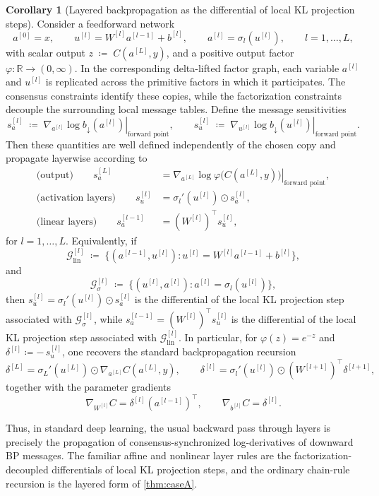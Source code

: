 \documentclass[12pt]{article}
\newcommand{\1}{\mathbb{1}}
\renewcommand{\phi}{\varphi}
\newcommand{\defeq}{\coloneq}
\theoremstyle{definition}
\newtheorem{corollary}[theorem]{Corollary}
\begin{document}
\begin{corollary}[Layered backpropagation as the differential of local KL projection steps]
\label{cor:layered-geometric}
Consider a feedforward network
\[
a^{[0]}=x,\qquad
u^{[l]}=W^{[l]}a^{[l-1]}+b^{[l]},\qquad
a^{[l]}=\sigma_l(u^{[l]}),
\qquad l=1,\dots,L,
\]
with scalar output $z \;\defeq\; C(a^{[L]},y)$, and a positive output factor $\phi:\mathbb{R}\to(0,\infty)$. In the corresponding delta-lifted factor graph, each variable
$a^{[l]}$ and $u^{[l]}$ is replicated across the primitive factors in which
it participates. The consensus constraints identify these copies, while the
factorization constraints decouple the surrounding local message tables.
Define the message sensitivities
\[
s_a^{[l]}
\;\defeq\;
\left.\nabla_{a^{[l]}} \log b_\downarrow(a^{[l]})\right|_{\text{forward point}},
\qquad
s_u^{[l]}
\;\defeq\;
\left.\nabla_{u^{[l]}} \log b_\downarrow(u^{[l]})\right|_{\text{forward point}}.
\]
Then these quantities are well defined independently of the chosen copy and
propagate layerwise according to
\begin{align*}
\text{(output)}\qquad
s_a^{[L]}
&=
\left.\nabla_{a^{[L]}} \log \phi\big(C(a^{[L]},y)\big)\right|_{\text{forward point}},\\[0.5em]
\text{(activation layers)}\qquad
s_u^{[l]}
&=
\sigma_l'(u^{[l]}) \odot s_a^{[l]},\\[0.5em]
\text{(linear layers)}\qquad
s_a^{[l-1]}
&=
(W^{[l]})^\top s_u^{[l]},
\end{align*}
for $l=1,\dots,L$. Equivalently, if
\[
\mathcal G_{\mathrm{lin}}^{[l]}
\;\defeq\;
\bigl\{(a^{[l-1]},u^{[l]}) : u^{[l]}=W^{[l]}a^{[l-1]}+b^{[l]}\bigr\},
\]
and
\[
\mathcal G_{\sigma}^{[l]}
\;\defeq\;
\bigl\{(u^{[l]},a^{[l]}) : a^{[l]}=\sigma_l(u^{[l]})\bigr\},
\]
then $s_u^{[l]}=\sigma_l'(u^{[l]})\odot s_a^{[l]}$ is the differential of the local KL projection step associated with
$\mathcal G_{\sigma}^{[l]}$, while $s_a^{[l-1]}=(W^{[l]})^\top s_u^{[l]}$ is the differential of the local KL projection step associated with
$\mathcal G_{\mathrm{lin}}^{[l]}$. In particular, for $\phi(z)=e^{-z}$ and $\delta^{[l]}\defeq -\,s_u^{[l]}$,
one recovers the standard backpropagation recursion
\[
\delta^{[L]}
=
\sigma_L'(u^{[L]}) \odot \nabla_{a^{[L]}} C(a^{[L]},y),
\qquad
\delta^{[l]}
=
\sigma_l'(u^{[l]}) \odot (W^{[l+1]})^\top \delta^{[l+1]},
\]
together with the parameter gradients
\[
\nabla_{W^{[l]}} C
=
\delta^{[l]}(a^{[l-1]})^\top,
\qquad
\nabla_{b^{[l]}} C
=
\delta^{[l]}.
\]

Thus, in standard deep learning, the usual backward pass through layers is
precisely the propagation of consensus-synchronized log-derivatives of
downward BP messages. The familiar affine and nonlinear layer rules are the
factorization-decoupled differentials of local KL projection steps, and the
ordinary chain-rule recursion is the layered form of \cref{thm:caseA}.
\end{corollary}
\end{document}
